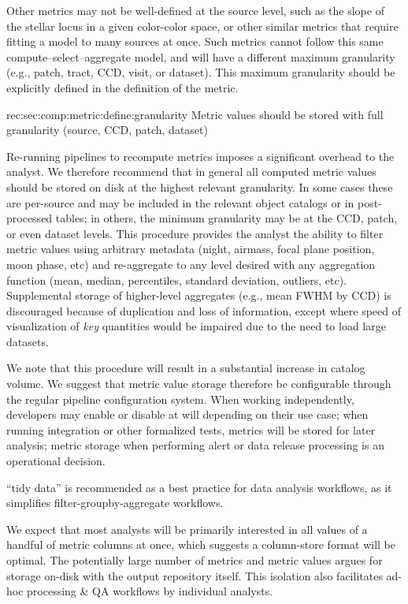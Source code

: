 Other metrics may not be well-defined at the source level, such as the slope of the stellar locus in a given color-color space, or other similar metrics that require fitting a model to many sources at once.
Such metrics cannot follow this same compute--select--aggregate model, and will have a different maximum granularity (e.g., patch, tract, CCD, visit, or dataset).
This maximum granularity should be explicitly defined in the definition of the metric.

\begin{recommendation}
    {rec:sec:comp:metric:define:granularity}
    {Metric values should be stored with full granularity (source, CCD, patch, dataset)}
\end{recommendation}

Re-running pipelines to recompute metrics imposes a significant overhead to the analyst.
We therefore recommend that in general all computed metric values should be stored on disk at the highest relevant granularity.
In some cases these are per-source and may be included in the relevant object catalogs or in post-processed tables; in others, the minimum granularity may be at the CCD, patch, or even dataset levels.
This procedure provides the analyst the ability to filter metric values using arbitrary metadata (night, airmass, focal plane position, moon phase, etc) and re-aggregate to any level desired with any aggregation function (mean, median, percentiles, standard deviation, outliers, etc).
Supplemental storage of higher-level aggregates (e.g., mean FWHM by CCD) is discouraged because of duplication and loss of information, except where speed of visualization of \emph{key} quantities would be impaired due to the need to load large datasets.

We note that this procedure will result in a substantial increase in catalog volume.
We suggest that metric value storage therefore be configurable through the regular pipeline configuration system.
When working independently, developers may enable or disable at will depending on their use case; when running integration or other formalized tests, metrics will be stored for later analysis; metric storage when performing alert or data release processing is an operational decision.

``\Gls{tidy data}'' is recommended as a best practice for data analysis workflows, as it simplifies filter-groupby-aggregate workflows.

We expect that most analysts will be primarily interested in all values of a handful of metric columns at once, which suggests a column-store format will be optimal.
The potentially large number of metrics and metric values argues for storage on-disk with the output repository itself.
This isolation also facilitates ad-hoc processing \& QA workflows by individual analysts.

